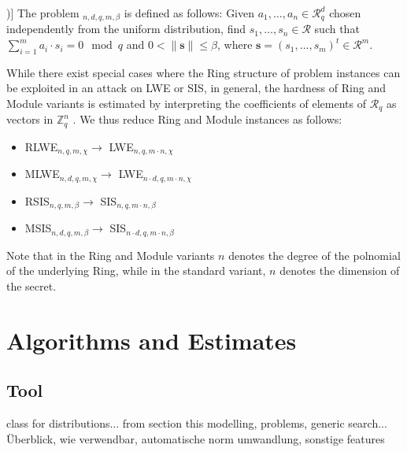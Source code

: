 \documentclass[
  a4paper,  %
  twoside,  %
  bibliography=totoc,
  headsepline,
  cleardoublepage=empty,
  parskip=half,
  draft=false
]{scrbook}
\begin{document}
\begin{definition}[Module-SIS Problem [\citealp{LS15}, Definition 3.3])]
  The problem $_{n, d, q, m, \beta}$ is defined as follows: Given $a_1, \ldots, a_n \in \mathcal{R}_q^d$ chosen independently from the uniform distribution, find $s_1, \ldots, s_n \in \mathcal{R}$ such that $\sum_{i=1}^m a_i \cdot s_i = 0\mod q$ and $0 < \| \textbf{s}\| \leq \beta$, where $\textbf{s} = (s_1, \ldots, s_m)^t \in \mathcal{R}^m$.
\end{definition} %


While there exist special cases where the Ring structure of problem instances can be exploited in an attack on LWE or SIS, %
in general, the hardness of Ring and Module variants is estimated by interpreting the coefficients of elements of $\mathcal{R}_q$ as vectors in $\mathbb{Z}_q^n$ \cite{ACDDPPVW18}.
We thus reduce Ring and Module instances as follows:
\begin{itemize}
  \item RLWE$_{n, q, m, \chi} \longrightarrow$ LWE$_{n, q, m \cdot n, \chi}$
  \item MLWE$_{n, d, q, m, \chi} \longrightarrow$ LWE$_{n \cdot d, q, m \cdot n, \chi}$
  \item RSIS$_{n, q, m, \beta} \longrightarrow$ SIS$_{n, q, m \cdot n, \beta}$
  \item MSIS$_{n, d, q, m, \beta} \longrightarrow$ SIS$_{n \cdot d, q, m \cdot n, \beta}$
\end{itemize}
Note that in the Ring and Module variants $n$ denotes the degree of the polnomial of the underlying Ring, %
while in the standard variant, $n$ denotes the dimension of the secret. 
  
  







\chapter{Algorithms and Estimates}



\section{Tool}
class for distributions... from section this modelling, problems, generic search... Überblick, wie verwendbar,
automatische norm umwandlung,
sonstige features
\end{document}

